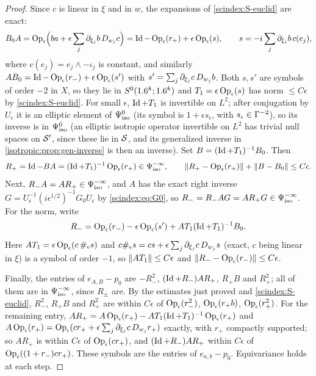 \begin{proof}
  Since $c$ is linear in $\xi$ and in $w$, the expansions of
  \ref{scindex:S-euclid} are exact:
  \begin{equation*}
    B_0A=\operatorname{Op}_\epsilon\Bigl(ba+\epsilon\sum_j\partial_{\xi_j}b\,D_{w_j}c\Bigr)
    =\operatorname{Id}-\operatorname{Op}_\epsilon(r_+)+\epsilon\operatorname{Op}_\epsilon(s),\qquad s=-i\sum_j\partial_{\xi_j}b\,c(e_j),
  \end{equation*}
  where $c(e_j)=e_j\wedge-\iota_j$ is constant, and similarly
  $AB_0=\operatorname{Id}-\operatorname{Op}_\epsilon(r_-)+\epsilon\operatorname{Op}_\epsilon(s')$ with $s'=\sum_j\partial_{\xi_j}c\,D_{w_j}b$.
  Both $s,s'$ are symbols of order $-2$ in $X$, so they lie in $S^{0}(1.6^k;1.6^k)$
  and $T_1=\epsilon\operatorname{Op}_\epsilon(s)$ has norm $\le C\epsilon$ by \ref{scindex:S-euclid}.
  For small $\epsilon$, $\operatorname{Id}+T_1$ is invertible on $L^2$; after conjugation by
  $U_\epsilon$ it is an elliptic element of $\Psi^{0}_{\mathrm{iso}}$ (its symbol is
  $1+\epsilon s_\epsilon$, with $s_\epsilon\in\Gamma^{-2}$), so its inverse is in
  $\Psi^{0}_{\mathrm{iso}}$ (an elliptic isotropic operator invertible on $L^2$ has trivial null
  spaces on $\mathcal{S}'$, since these lie in $\mathcal{S}$, and its generalized inverse in
  \cref{isotropic:prop:gen-inverse} is then an inverse). Set $B=(\operatorname{Id}+T_1)^{-1}B_0$. Then
  \begin{equation*}
    R_+=\operatorname{Id}-BA=(\operatorname{Id}+T_1)^{-1}\operatorname{Op}_\epsilon(r_+)\in\Psi^{-\infty}_{\mathrm{iso}},\qquad
    \lVert R_+-\operatorname{Op}_\epsilon(r_+)\rVert+\lVert B-B_0\rVert\le C\epsilon.
  \end{equation*}
  Next, $R_-A=AR_+\in\Psi^{-\infty}_{\mathrm{iso}}$, and $A$ has the exact right inverse
  $G=U_\epsilon^{-1}(i\epsilon^{1/2})^{-1}G_0U_\epsilon$ by \eqref{scindex:eq:G0},
  so $R_-=R_-AG=AR_+G\in\Psi^{-\infty}_{\mathrm{iso}}$. For the norm, write
  \begin{equation*}
    R_-=\operatorname{Op}_\epsilon(r_-)-\epsilon\operatorname{Op}_\epsilon(s')+AT_1(\operatorname{Id}+T_1)^{-1}B_0 .
  \end{equation*}
  Here $AT_1=\epsilon\operatorname{Op}_\epsilon(c\,\#_\epsilon s)$ and $c\#_\epsilon s=cs+\epsilon
  \sum_j\partial_{\xi_j}c\,D_{w_j}s$ (exact, $c$ being linear in $\xi$) is a symbol of
  order $-1$, so $\lVert AT_1\rVert\le C\epsilon$ and $\lVert R_--\operatorname{Op}_\epsilon(r_-)\rVert\le C\epsilon$.

  Finally, the entries of $e_{A,B}-p_0$ are $-R_-^2$, $(\operatorname{Id}+R_-)AR_+$, $R_+B$ and
  $R_+^2$; all of them are in $\Psi^{-\infty}_{\mathrm{iso}}$, since $R_\pm$ are. By the
  estimates just proved and \ref{scindex:S-euclid}, $R_-^2$, $R_+B$ and $R_+^2$
  are within $C\epsilon$ of $\operatorname{Op}_\epsilon(r_-^2)$, $\operatorname{Op}_\epsilon(r_+b)$, $\operatorname{Op}_\epsilon(r_+^2)$. For the
  remaining entry, $AR_+=A\operatorname{Op}_\epsilon(r_+)-AT_1(\operatorname{Id}+T_1)^{-1}\operatorname{Op}_\epsilon(r_+)$ and
  $A\operatorname{Op}_\epsilon(r_+)=\operatorname{Op}_\epsilon(cr_++\epsilon\sum_j\partial_{\xi_j}c\,D_{w_j}r_+)$ exactly, with
  $r_+$ compactly supported; so $AR_+$ is within $C\epsilon$ of $\operatorname{Op}_\epsilon(cr_+)$, and
  $(\operatorname{Id}+R_-)AR_+$ within $C\epsilon$ of $\operatorname{Op}_\epsilon((1+r_-)cr_+)$. These symbols are the
  entries of $e_{a,b}-p_0$. Equivariance holds at each step.
\end{proof}

